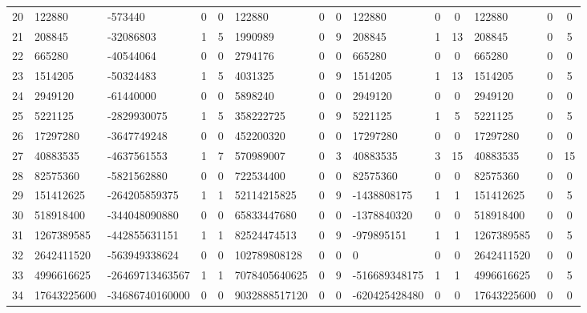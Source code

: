 \documentclass[12pt,reqno]{article}
\numberwithin{sfootnote}{section}
\numberwithin{equation}{section}
\theoremstyle{DefaultTheoremStyle}
\theoremstyle{definition}
\begin{document}
\begin{sidewaystable}
\begin{tabular}{|l|l|lcc|lcc|lcc|lcc|}
 20 & 122880 & -573440 & 0 & 0 & 122880 & 0 & 0 & 122880 & 0 & 0 & 122880 & 0 & 0 \\
 21 & 208845 & -32086803 & 1 & 5 & 1990989 & 0 & 9 & 208845 & 1 & 13 & 208845 & 0 & 5 \\
 22 & 665280 & -40544064 & 0 & 0 & 2794176 & 0 & 0 & 665280 & 0 & 0 & 665280 & 0 & 0 \\
 23 & 1514205 & -50324483 & 1 & 5 & 4031325 & 0 & 9 & 1514205 & 1 & 13 & 1514205 & 0 & 5 \\
 24 & 2949120 & -61440000 & 0 & 0 & 5898240 & 0 & 0 & 2949120 & 0 & 0 & 2949120 & 0 & 0 \\
 25 & 5221125 & -2829930075 & 1 & 5 & 358222725 & 0 & 9 & 5221125 & 1 & 5 & 5221125 & 0 & 5 \\
 26 & 17297280 & -3647749248 & 0 & 0 & 452200320 & 0 & 0 & 17297280 & 0 & 0 & 17297280 & 0 & 0 \\
 27 & 40883535 & -4637561553 & 1 & 7 & 570989007 & 0 & 3 & 40883535 & 3 & 15 & 40883535 & 0 & 15 \\
 28 & 82575360 & -5821562880 & 0 & 0 & 722534400 & 0 & 0 & 82575360 & 0 & 0 & 82575360 & 0 & 0 \\
 29 & 151412625 & -264205859375 & 1 & 1 & 52114215825 & 0 & 9 & -1438808175 & 1 & 1 & 151412625 & 0 & 5 \\
 30 & 518918400 & -344048090880 & 0 & 0 & 65833447680 & 0 & 0 & -1378840320 & 0 & 0 & 518918400 & 0 & 0 \\
 31 & 1267389585 & -442855631151 & 1 & 1 & 82524474513 & 0 & 9 & -979895151 & 1 & 1 & 1267389585 & 0 & 5 \\
 32 & 2642411520 & -563949338624 & 0 & 0 & 102789808128 & 0 & 0 & 0 & 0 & 0 & 2642411520 & 0 & 0 \\
 33 & 4996616625 & -26469713463567 & 1 & 1 & 7078405640625 & 0 & 9 & -516689348175 & 1 & 1 & 4996616625 & 0 & 5 \\
 34 & 17643225600 & -34686740160000 & 0 & 0 & 9032888517120 & 0 & 0 & -620425428480 & 0 & 0 & 17643225600 & 0 & 0 \\

\end{tabular}
\end{sidewaystable}
\end{document}
